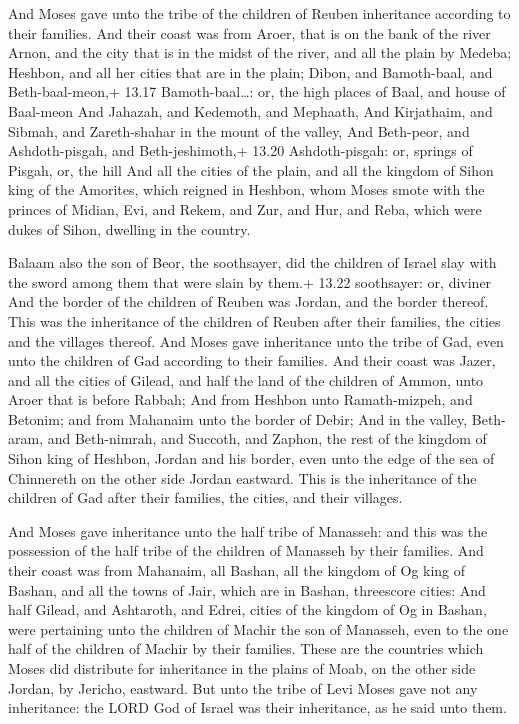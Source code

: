  And Moses gave unto the tribe of the children of Reuben
inheritance according to their families.  And their coast
was from Aroer, that is on the bank of the river Arnon, and the city
that is in the midst of the river, and all the plain by Medeba;
 Heshbon, and all her cities that are in the plain; Dibon,
and Bamoth-baal, and Beth-baal-meon,+ 13.17 Bamoth-baal\ldots: or, the
high places of Baal, and house of Baal-meon  And Jahazah,
and Kedemoth, and Mephaath,  And Kirjathaim, and Sibmah,
and Zareth-shahar in the mount of the valley,  And
Beth-peor, and Ashdoth-pisgah, and Beth-jeshimoth,+ 13.20
Ashdoth-pisgah: or, springs of Pisgah, or, the hill  And
all the cities of the plain, and all the kingdom of Sihon king of the
Amorites, which reigned in Heshbon, whom Moses smote with the princes of
Midian, Evi, and Rekem, and Zur, and Hur, and Reba, which were dukes of
Sihon, dwelling in the country.

 Balaam also the son of Beor, the soothsayer, did the
children of Israel slay with the sword among them that were slain by
them.+ 13.22 soothsayer: or, diviner  And the border of the
children of Reuben was Jordan, and the border thereof. This was the
inheritance of the children of Reuben after their families, the cities
and the villages thereof.  And Moses gave inheritance unto
the tribe of Gad, even unto the children of Gad according to their
families.  And their coast was Jazer, and all the cities of
Gilead, and half the land of the children of Ammon, unto Aroer that is
before Rabbah;  And from Heshbon unto Ramath-mizpeh, and
Betonim; and from Mahanaim unto the border of Debir;  And
in the valley, Beth-aram, and Beth-nimrah, and Succoth, and Zaphon, the
rest of the kingdom of Sihon king of Heshbon, Jordan and his border,
even unto the edge of the sea of Chinnereth on the other side Jordan
eastward.  This is the inheritance of the children of Gad
after their families, the cities, and their villages.

 And Moses gave inheritance unto the half tribe of
Manasseh: and this was the possession of the half tribe of the children
of Manasseh by their families.  And their coast was from
Mahanaim, all Bashan, all the kingdom of Og king of Bashan, and all the
towns of Jair, which are in Bashan, threescore cities:  And
half Gilead, and Ashtaroth, and Edrei, cities of the kingdom of Og in
Bashan, were pertaining unto the children of Machir the son of Manasseh,
even to the one half of the children of Machir by their families.
 These are the countries which Moses did distribute for
inheritance in the plains of Moab, on the other side Jordan, by Jericho,
eastward.  But unto the tribe of Levi Moses gave not any
inheritance: the LORD God of Israel was their inheritance, as he said
unto them.

